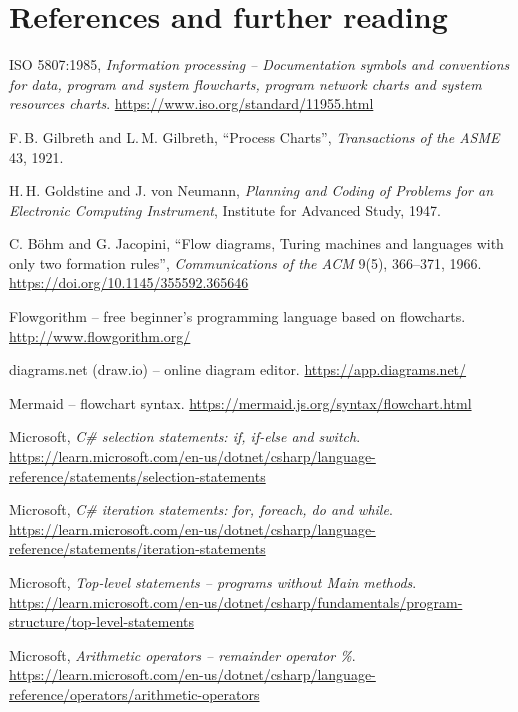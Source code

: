 \documentclass[11pt,a4paper]{article}
\begin{document}
\section*{References and further reading}
\begin{enumerate}[label={[\arabic*]},leftmargin=*,itemsep=1pt,font=\small]\small\raggedright
  \item ISO 5807:1985, \emph{Information processing -- Documentation symbols and conventions for data, program and system flowcharts, program network charts and system resources charts}. \url{https://www.iso.org/standard/11955.html}
  \item F.\,B. Gilbreth and L.\,M. Gilbreth, ``Process Charts'', \emph{Transactions of the ASME} 43, 1921.
  \item H.\,H. Goldstine and J. von Neumann, \emph{Planning and Coding of Problems for an Electronic Computing Instrument}, Institute for Advanced Study, 1947.
  \item C. Böhm and G. Jacopini, ``Flow diagrams, Turing machines and languages with only two formation rules'', \emph{Communications of the ACM} 9(5), 366--371, 1966. \url{https://doi.org/10.1145/355592.365646}
  \item Flowgorithm -- free beginner's programming language based on flowcharts. \url{http://www.flowgorithm.org/}
  \item diagrams.net (draw.io) -- online diagram editor. \url{https://app.diagrams.net/}
  \item Mermaid -- flowchart syntax. \url{https://mermaid.js.org/syntax/flowchart.html}
  \item Microsoft, \emph{C\# selection statements: if, if-else and switch}. \url{https://learn.microsoft.com/en-us/dotnet/csharp/language-reference/statements/selection-statements}
  \item Microsoft, \emph{C\# iteration statements: for, foreach, do and while}. \url{https://learn.microsoft.com/en-us/dotnet/csharp/language-reference/statements/iteration-statements}
  \item Microsoft, \emph{Top-level statements -- programs without Main methods}. \url{https://learn.microsoft.com/en-us/dotnet/csharp/fundamentals/program-structure/top-level-statements}
  \item Microsoft, \emph{Arithmetic operators -- remainder operator \%}. \url{https://learn.microsoft.com/en-us/dotnet/csharp/language-reference/operators/arithmetic-operators}
\end{enumerate}
\end{document}
